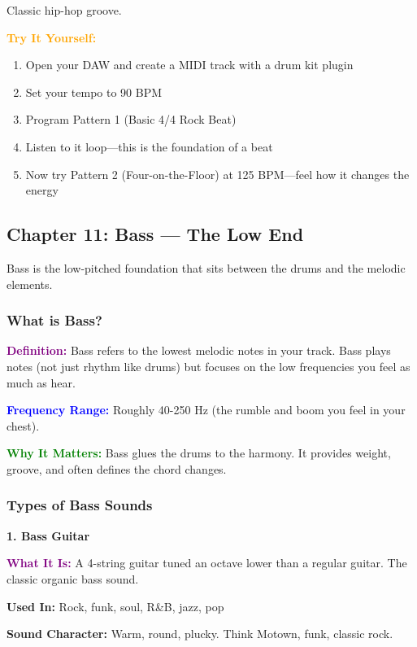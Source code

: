 \documentclass[11pt,letterpaper]{article}
\newcommand{\purple}[1]{\textcolor{purple}{\textbf{#1}}}
\newcommand{\bluepurple}[1]{\textcolor{blue}{\textbf{#1}}}
\newcommand{\greentext}[1]{\textcolor{green}{\textbf{#1}}}
\newcommand{\orangetext}[1]{\textcolor{orange}{\textbf{#1}}}
\begin{document}
Classic hip-hop groove.

\textbf{\orangetext{Try It Yourself:}}

\begin{enumerate}[leftmargin=*]
\item Open your DAW and create a MIDI track with a drum kit plugin
\item Set your tempo to 90 BPM
\item Program Pattern 1 (Basic 4/4 Rock Beat)
\item Listen to it loop—this is the foundation of a beat
\item Now try Pattern 2 (Four-on-the-Floor) at 125 BPM—feel how it changes the energy
\end{enumerate}

\newpage

\subsection{Chapter 11: Bass — The Low End}

Bass is the low-pitched foundation that sits between the drums and the melodic elements.

\subsubsection{What is Bass?}

\textbf{\purple{Definition:}} Bass refers to the lowest melodic notes in your track. Bass plays notes (not just rhythm like drums) but focuses on the low frequencies you feel as much as hear.

\textbf{\bluepurple{Frequency Range:}} Roughly 40-250 Hz (the rumble and boom you feel in your chest).

\textbf{\greentext{Why It Matters:}} Bass glues the drums to the harmony. It provides weight, groove, and often defines the chord changes.

\subsubsection{Types of Bass Sounds}

\textbf{1. Bass Guitar}

\textbf{\purple{What It Is:}} A 4-string guitar tuned an octave lower than a regular guitar. The classic organic bass sound.

\textbf{Used In:} Rock, funk, soul, R\&B, jazz, pop

\textbf{Sound Character:} Warm, round, plucky. Think Motown, funk, classic rock.
\end{document}
